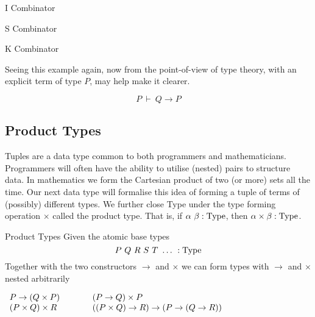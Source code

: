 \documentclass{book}
\begin{document}
        \begin{eg}{I Combinator}
        
        \end{eg}
    
        \begin{eg}{S Combinator}
            
        \end{eg}
    
        \begin{eg}{K Combinator}
            
            Seeing this example again, now from the point-of-view of type theory, with an explicit term of type $P$, may help make it clearer. 
    
            $$P \ \vdash \ Q \to P$$
    
        \end{eg}

    \newpage
    \subsection*{Product Types}

        Tuples are a data type common to both programmers and mathematicians. Programmers will often have the ability to utilise (nested) pairs to structure data. In mathematics we form the Cartesian product of two (or more) sets all the time. Our next data type will formalise this idea of forming a tuple of terms of (possibly) different types. We further close Type under the type forming operation $\times$ called the product type. That is, if $\alpha \ \beta : \type$, then $\alpha \times \beta : \text{Type}$.

        \begin{eg}{Product Types}            
            Given the atomic base types $$P \ Q \ R \ S \ T \ \dots \ : \text{Type} $$ Together with the two constructors $\to$ and $\times$ we can form types with $\to$ and $\times$ nested arbitrarily
            
            \begin{center}
                $\begin{array}{l l}
                    
                    P \to (Q \times P) \hspace{1cm} & (P \to Q) \times P \\
                    (P \times Q) \times R & ((P \times Q) \to R) \to (P \to (Q \to R))
                \end{array}$
            \end{center}

        \end{eg}
\end{document}

